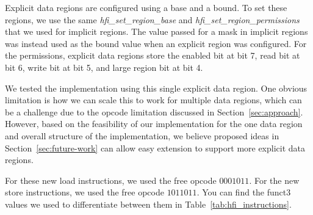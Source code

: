 \documentclass[conference,compsoc]{IEEEtran}
\begin{document}
Explicit data regions are configured using a base and a bound. To set these regions, we use the same \textit{hfi\_set\_region\_base} and \textit{hfi\_set\_region\_permissions} that we used for implicit regions. The value passed for a mask in implicit regions was instead used as the bound value when an explicit region was configured. For the permissions, explicit data regions store the enabled bit at bit 7, read bit at bit 6, write bit at bit 5, and large region bit at bit 4.

We tested the implementation using this single explicit data region. One obvious limitation is how we can scale this to work for multiple data regions, which can be a challenge due to the opcode limitation discussed in Section~\ref{sec:approach}. However, based on the feasibility of our implementation for the one data region and overall structure of the implementation, we believe proposed ideas in Section~\ref{sec:future-work} can allow easy extension to support more explicit data regions.

For these new load instructions, we used the free opcode $0001011$. For the new store instructions, we used the free opcode $1011011$. You can find the funct3 values we used to differentiate between them in Table~\ref{tab:hfi_instructions}.
\end{document}
